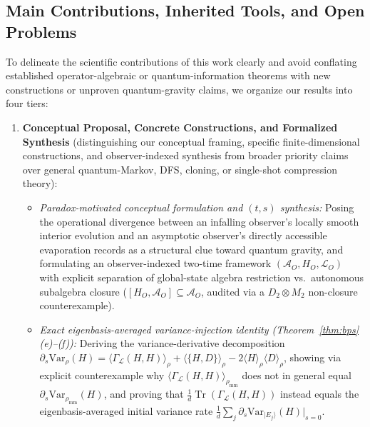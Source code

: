\documentclass[11pt,a4paper]{article}
\theoremstyle{definition}
\theoremstyle{remark}
\newcommand{\Tr}{\operatorname{Tr}}
\newcommand{\cA}{\mathcal{A}}
\newcommand{\cL}{\mathcal{L}}
\newcommand{\1}{\mathbf{1}}
\begin{document}
\subsection{Main Contributions, Inherited Tools, and Open Problems}\label{sec:novelty}

To delineate the scientific contributions of this work clearly and avoid conflating established operator-algebraic or quantum-information theorems with new constructions or unproven quantum-gravity claims, we organize our results into four tiers:

\begin{enumerate}
  \item \textbf{Conceptual Proposal, Concrete Constructions, and Formalized Synthesis} (distinguishing our conceptual framing, specific finite-dimensional constructions, and observer-indexed synthesis from broader priority claims over general quantum-Markov, DFS, cloning, or single-shot compression theory):
  \begin{itemize}
    \item \emph{Paradox-motivated conceptual formulation and $(t,s)$ synthesis:} Posing the operational divergence between an infalling observer's locally smooth interior evolution and an asymptotic observer's directly accessible evaporation records as a structural clue toward quantum gravity, and formulating an observer-indexed two-time framework $(\cA_O, H_O, \cL_O)$ with explicit separation of global-state algebra restriction vs.\ autonomous subalgebra closure ($[H_O,\cA_O]\subseteq\cA_O$, audited via a $D_2\otimes M_2$ non-closure counterexample).
    \item \emph{Exact eigenbasis-averaged variance-injection identity (Theorem~\ref{thm:bps}(e)--(f)):} Deriving the variance-derivative decomposition $\partial_s\mathrm{Var}_\rho(H) = \allowbreak \langle\Gamma_{\cL}(H,H)\rangle_\rho + \langle\{H,D\}\rangle_\rho - 2\langle H\rangle_\rho\langle D\rangle_\rho$, showing via explicit counterexample why $\langle\Gamma_{\cL}(H,H)\rangle_{\rho_{\mathrm{mm}}}$ does not in general equal $\partial_s\mathrm{Var}_{\rho_{\mathrm{mm}}}(H)$, and proving that $\frac{1}{d}\Tr(\Gamma_{\cL}(H,H))$ instead equals the eigenbasis-averaged initial variance rate $\frac{1}{d}\sum_j \partial_s\mathrm{Var}_{|E_j\rangle}(H)|_{s=0}$.

\end{itemize}
\end{enumerate}
\end{document}

